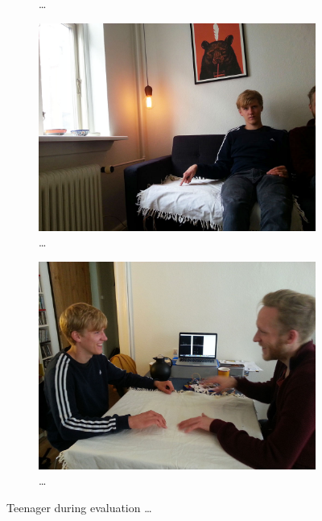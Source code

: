 \begin{figure}
\begin{subfigure}[b]{0.45\textwidth}
                \caption{\dots}
                \label{fig:textiletouch:eval:sebastian:sofa_behind}
        \end{subfigure}

        \begin{subfigure}[b]{0.45\textwidth}
                \centering
                \includegraphics[width=\textwidth]{figures/touch/evaluation/sebastian/sofa_infront_seb}
                \caption{\dots}
                \label{fig:textiletouch:eval:sebastian:sofa_front}
        \end{subfigure}
        \begin{subfigure}[b]{0.45\textwidth}
                \centering
                \includegraphics[width=\textwidth]{figures/touch/evaluation/sebastian/table}
                \caption{\dots}
                \label{fig:textiletouch:eval:sebastian:table}
        \end{subfigure}
        \caption{Teenager during evaluation \dots}
        \label{fig:textiletouch:eval:sebastian}
\end{figure}

